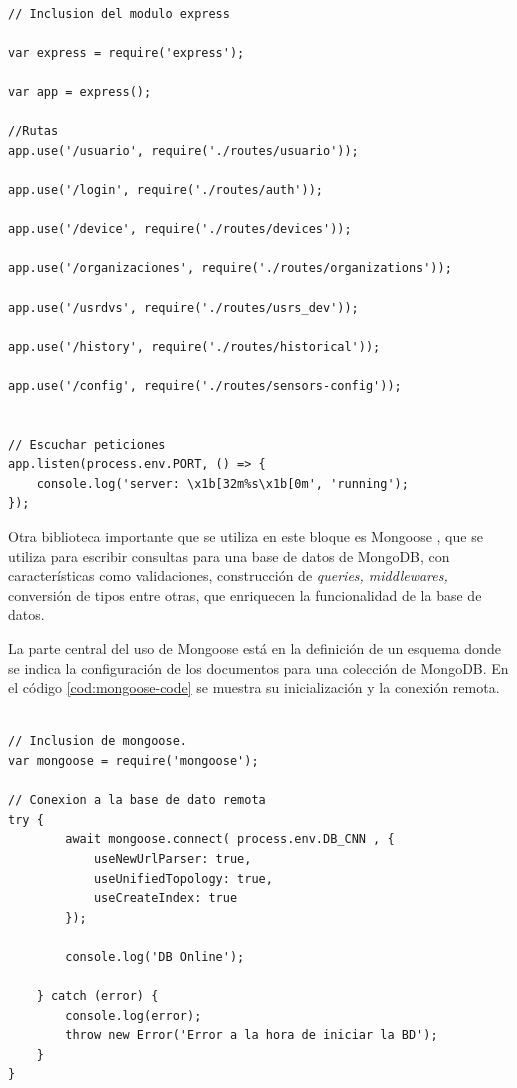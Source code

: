 \begin{lstlisting}[label=cod:express-code,caption=Utilización de Express para crear rutas en el servidor.] 

// Inclusion del modulo express

var express = require('express');

var app = express();

//Rutas 
app.use('/usuario', require('./routes/usuario'));

app.use('/login', require('./routes/auth'));

app.use('/device', require('./routes/devices'));

app.use('/organizaciones', require('./routes/organizations'));

app.use('/usrdvs', require('./routes/usrs_dev'));

app.use('/history', require('./routes/historical'));

app.use('/config', require('./routes/sensors-config'));


// Escuchar peticiones
app.listen(process.env.PORT, () => {
    console.log('server: \x1b[32m%s\x1b[0m', 'running');
});

\end{lstlisting}

Otra biblioteca importante que se utiliza en este bloque es Mongoose \citep{WEBSITE:38}, que se utiliza para escribir consultas para una base de datos de MongoDB, con características como validaciones, construcción de \textit{queries, middlewares,} conversión de tipos entre otras, que enriquecen la funcionalidad de la base de datos. 

La parte central del uso de Mongoose está en la definición de un esquema donde se indica la configuración de los documentos para una colección de MongoDB.  En el código \ref{cod:mongoose-code} se muestra su inicialización y la conexión remota. 

\begin{lstlisting}[label=cod:mongoose-code,caption=Utilización de Mongoose para el manejo de MongoDB.] 

// Inclusion de mongoose.
var mongoose = require('mongoose');

// Conexion a la base de dato remota
try {
        await mongoose.connect( process.env.DB_CNN , {
            useNewUrlParser: true, 
            useUnifiedTopology: true,
            useCreateIndex: true
        });

        console.log('DB Online');
        
    } catch (error) {
        console.log(error);
        throw new Error('Error a la hora de iniciar la BD');
    }
}

\end{lstlisting}


